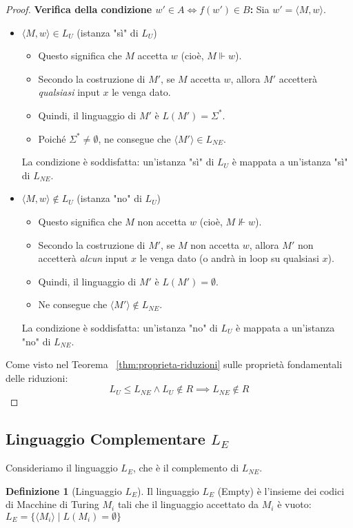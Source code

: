 \documentclass[a4paper]{article}
\theoremstyle{definition} %
\newtheorem{definition}[theorem]{Definizione}
\begin{document}
\begin{proof}
\textbf{Verifica della condizione $w' \in A \iff f(w') \in B$:}
Sia $w' = \langle M, w \rangle$.

\begin{itemize}
    \item[\textbf{Caso 1:}] $\langle M, w \rangle \in L_U$ (istanza "sì" di $L_U$)
    \begin{itemize}
        \item Questo significa che $M$ accetta $w$ (cioè, $M \Vdash w$).
        \item Secondo la costruzione di $M'$, se $M$ accetta $w$, allora $M'$ accetterà \emph{qualsiasi} input $x$ le venga dato.
        \item Quindi, il linguaggio di $M'$ è $L(M') = \Sigma^*$.
        \item Poiché $\Sigma^* \neq \emptyset$, ne consegue che $\langle M' \rangle \in L_{NE}$.
    \end{itemize}
    La condizione è soddisfatta: un'istanza "sì" di $L_U$ è mappata a un'istanza "sì" di $L_{NE}$.
    \item[\textbf{Caso 2:}] $\langle M, w \rangle \notin L_U$ (istanza "no" di $L_U$)

    \begin{itemize}
        \item Questo significa che $M$ non accetta $w$ (cioè, $M \not\Vdash w$).
        \item Secondo la costruzione di $M'$, se $M$ non accetta $w$, allora $M'$ non accetterà \emph{alcun} input $x$ le venga dato (o andrà in loop su qualsiasi $x$).
        \item Quindi, il linguaggio di $M'$ è $L(M') = \emptyset$.
        \item Ne consegue che $\langle M' \rangle \notin L_{NE}$.
    \end{itemize}
    La condizione è soddisfatta: un'istanza "no" di $L_U$ è mappata a un'istanza "no" di $L_{NE}$.
\end{itemize}

Come visto nel Teorema ~\ref{thm:proprieta-riduzioni} sulle proprietà fondamentali delle riduzioni:
\[
L_U \le L_{NE} \land L_U \notin R \implies L_{NE} \notin R
\]
\end{proof}

\subsection{Linguaggio Complementare $L_E$}

Consideriamo il linguaggio $L_E$, che è il complemento di $L_{NE}$.
\begin{definition}[Linguaggio $L_E$]
Il linguaggio $L_E$ (Empty) è l'insieme dei codici di Macchine di Turing $M_i$ tali che il linguaggio accettato da $M_i$ è vuoto:
$L_E = \{ \langle M_i \rangle \mid L(M_i) = \emptyset \}$
\end{definition}
\end{document}
